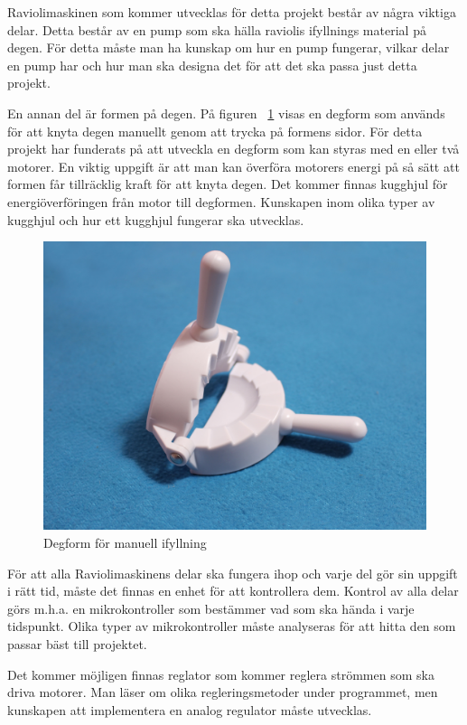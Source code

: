 
Raviolimaskinen som kommer utvecklas för detta projekt består av några viktiga delar. Detta består av en pump som ska hälla raviolis ifyllnings material på degen. För detta måste man ha kunskap om hur en pump fungerar, vilkar delar en pump har och hur man ska designa det för att det ska passa just detta projekt.\medskip


En annan del är formen på degen. På figuren ~\ref{degfrom} visas en degform som används för att knyta degen manuellt genom att trycka på formens sidor. För detta projekt har funderats på att utveckla en degform som kan styras med en eller två motorer. En viktig uppgift är att man kan  överföra motorers energi på så sätt att formen får tillräcklig kraft för att knyta degen. Det kommer finnas kugghjul för energiöverföringen från motor till degformen. Kunskapen inom olika typer av kugghjul och hur ett kugghjul fungerar ska utvecklas.\medskip

\begin{figure}[h]
	\begin{center}
		\includegraphics[scale=0.08] {images/degform.jpg}
		\caption{Degform för manuell ifyllning}
		\label{degfrom}	
	\end{center}
\end{figure}\medskip

För att alla Raviolimaskinens delar ska fungera ihop och varje del gör sin uppgift i rätt tid, måste det finnas en enhet för att kontrollera dem. Kontrol av alla delar görs m.h.a. en mikrokontroller som bestämmer vad som ska hända i varje tidspunkt. Olika typer av mikrokontroller måste analyseras för att hitta den som passar bäst till projektet.

Det kommer möjligen finnas reglator som kommer reglera strömmen som ska driva motorer. Man läser om olika regleringsmetoder under programmet, men kunskapen att implementera en analog regulator måste utvecklas.




